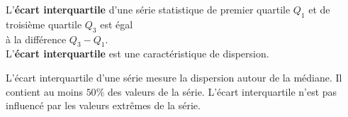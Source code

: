 \begin{Définition}
L'{\bf{écart interquartile}} d'une série statistique de premier quartile $Q_1$ et de troisième quartile $Q_3$ est égal \\ à la différence $Q_3 - Q_1$. \\
L'{\bf{écart interquartile}} est une caractéristique de dispersion.


\end{Définition}
\vspace{0.3cm}
\begin{Remarque}
L'écart interquartile d'une série mesure la dispersion autour de la médiane. Il contient au moins $50\%$ des valeurs de la série.
L'écart interquartile n'est pas influencé par les valeurs extrêmes de la série.
\end{Remarque}
\vspace{0.3cm}
